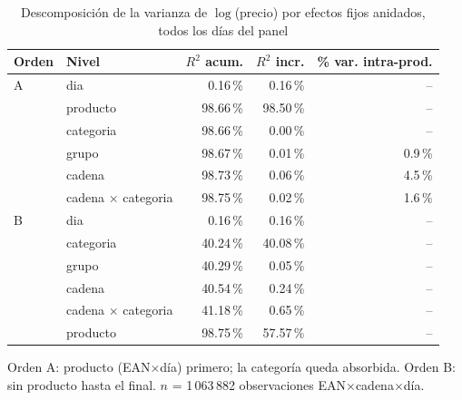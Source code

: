 \begin{table}[htbp]
\caption{Descomposici\'on de la varianza de $\log$(precio) por efectos fijos anidados, todos los d\'ias del panel}
\label{tab:varianza}
\centering\scriptsize\setlength{\tabcolsep}{3pt}
\begin{tabular}{@{}llrrr@{}}
\toprule
Orden & Nivel & $R^2$ acum. & $R^2$ incr. & \% var. intra-prod. \\
\midrule
A & dia & 0.16\,\% & 0.16\,\% & -- \\
 & producto & 98.66\,\% & 98.50\,\% & -- \\
 & categoria & 98.66\,\% & 0.00\,\% & -- \\
 & grupo & 98.67\,\% & 0.01\,\% & 0.9\,\% \\
 & cadena & 98.73\,\% & 0.06\,\% & 4.5\,\% \\
 & cadena $\times$ categoria & 98.75\,\% & 0.02\,\% & 1.6\,\% \\
\midrule
B & dia & 0.16\,\% & 0.16\,\% & -- \\
 & categoria & 40.24\,\% & 40.08\,\% & -- \\
 & grupo & 40.29\,\% & 0.05\,\% & -- \\
 & cadena & 40.54\,\% & 0.24\,\% & -- \\
 & cadena $\times$ categoria & 41.18\,\% & 0.65\,\% & -- \\
 & producto & 98.75\,\% & 57.57\,\% & -- \\
\bottomrule\end{tabular}
\par\smallskip\raggedright\scriptsize Orden A: producto (EAN$\times$d\'ia) primero; la categor\'ia queda absorbida. Orden B: sin producto hasta el final. $n$ = 1\,063\,882 observaciones EAN$\times$cadena$\times$d\'ia.
\end{table}
